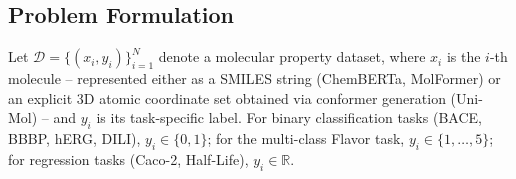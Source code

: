 \documentclass[pdflatex,sn-mathphys-num]{sn-jnl}%
\begin{document}
\begin{table}[!ht]
\centering
\caption{Structural summary of the seven PEARL benchmark datasets.}
\label{tab:dataset_summary}
\end{table}

\subsection{Problem Formulation}\label{sec:problem_formulation}
Let $\mathcal{D} = \{(x_i, y_i)\}_{i=1}^{N}$ denote a molecular property dataset, where $x_i$ is the $i$-th molecule -- represented either as a SMILES string (ChemBERTa, MolFormer) or an explicit 3D atomic coordinate set obtained via conformer generation (Uni-Mol) -- and $y_i$ is its task-specific label. For binary classification tasks (BACE, BBBP, hERG, DILI), $y_i \in \{0,1\}$; for the multi-class Flavor task, $y_i \in \{1,\dots,5\}$; for regression tasks (Caco-2, Half-Life), $y_i \in \mathbb{R}$.
\end{document}
